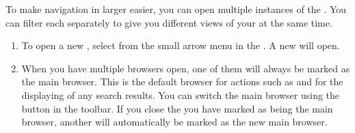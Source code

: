 
To make navigation in larger \gdprojects{} easier, you can open multiple instances of the \gdtestcasebrowser{}. You can filter each \gdtestcasebrowser{} separately to give you different views of your \gdcases{} at the same time.

\begin{enumerate}
\item To open a new \gdtestcasebrowser{}, select  from the small arrow menu in the \gdtestcasebrowser{}. A new \gdtestcasebrowser{} will open.
\item When you have multiple browsers open, one of them will always be marked as the main browser. This is the default browser for actions such as  and for the displaying of any search results. You can switch the main browser using the button in the toolbar. If you close the \gdtestcasebrowser{} you have marked as being the main browser, another \gdtestcasebrowser{} will automatically be marked as the new main browser.
\end{enumerate}
